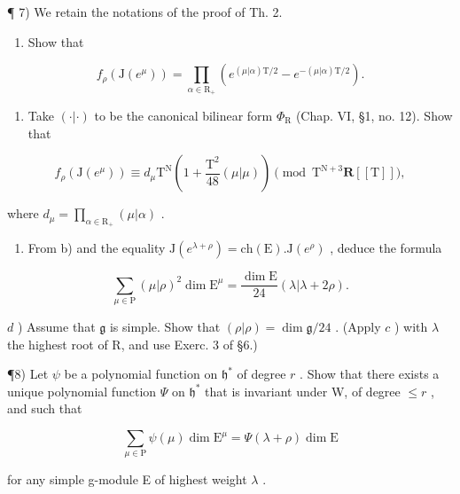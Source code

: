 ¶ 7) We retain the notations of the proof of Th. 2.

\begin{enumerate}
\def\labelenumi{\alph{enumi})}
\tightlist
\item
  Show that
\end{enumerate}

\[
f _ {\rho} (\mathrm{J} (e ^ {\mu})) = \prod_ {\alpha \in \mathrm{R} _ {+}} (e ^ {(\mu | \alpha) \mathrm{T} / 2} - e ^ {- (\mu | \alpha) \mathrm{T} / 2}).
\]

\begin{enumerate}
\def\labelenumi{\alph{enumi})}
\setcounter{enumi}{1}
\tightlist
\item
  Take \((\cdot |\cdot)\) to be the canonical bilinear form \(\varPhi_{\mathrm{R}}\) (Chap. VI, §1, no. 12). Show that
\end{enumerate}

\[
  f _ {\rho} (\mathrm{J} (e ^ {\mu})) \equiv d _ {\mu} \mathrm{T} ^ {\mathrm{N}} \left(1 + \frac {\mathrm{T} ^ {2}}{48} (\mu | \mu)\right) \pmod {\mathrm{T} ^ {\mathrm{N} + 3} \mathbf {R} [ [ \mathrm{T} ] ]},
\]

where \(d_{\mu} = \prod_{\alpha \in \mathrm{R}_{+}}(\mu |\alpha)\) .

\begin{enumerate}
\def\labelenumi{\alph{enumi})}
\setcounter{enumi}{2}
\tightlist
\item
  From b) and the equality \(\mathrm{J}(e^{\lambda+\rho})=\mathrm{ch}(\mathrm{E}).\mathrm{J}(e^{\rho})\) , deduce the formula
\end{enumerate}

\[
  \sum_ {\mu \in \mathrm{P}} (\mu | \rho) ^ {2} \dim \mathrm{E} ^ {\mu} = \frac {\dim \mathrm{E}}{24} (\lambda | \lambda + 2 \rho).
\]

\(d\) ) Assume that \(\mathfrak{g}\) is simple. Show that \((\rho |\rho) = \dim \mathfrak{g} / 24\) . (Apply \(c\) ) with \(\lambda\) the highest root of R, and use Exerc. 3 of §6.)

¶8) Let \(\psi\) be a polynomial function on \(\mathfrak{h}^*\) of degree \(r\) . Show that there exists a unique polynomial function \(\varPsi\) on \(\mathfrak{h}^*\) that is invariant under W, of degree \(\leq r\) , and such that

\[
\sum_ {\mu \in \mathrm{P}} \psi (\mu) \dim \mathrm{E} ^ {\mu} = \varPsi (\lambda + \rho) \dim \mathrm{E}
\]

for any simple g-module E of highest weight \(\lambda\) .

